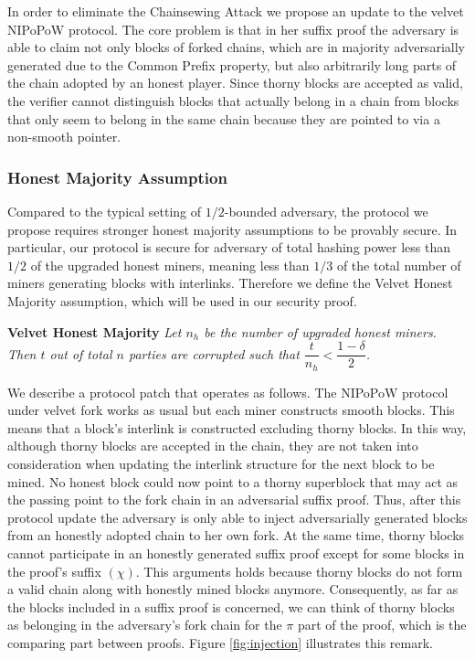 In order to eliminate the Chainsewing Attack we propose an update to the velvet
NIPoPoW protocol. The core problem is that in her suffix proof the adversary
is able to claim not only blocks of forked chains,  which are in majority adversarially
generated due to the Common Prefix property, but also arbitrarily long parts of the
chain adopted by an honest player. Since thorny blocks are accepted as valid,
the verifier cannot distinguish blocks that actually belong in a chain from
blocks that only seem to belong in the same chain because they are pointed to
via a non-smooth pointer. \\


\subsubsection{Honest Majority Assumption}
Compared to the typical setting of $1/2$-bounded adversary, the protocol we
propose requires stronger honest majority assumptions to be provably secure. 
In particular, our protocol is secure for adversary of total hashing power 
less than $1/2$ of the upgraded honest miners, meaning less than $1/3$ of the total number of miners generating blocks with interlinks. Therefore we define the Velvet Honest Majority assumption, which will be used in our security proof.

\begin{defn}{\textbf{Velvet Honest Majority}}
	\textit{Let $n_h$ be the number of upgraded honest miners. Then $t$ out of total $n$
	parties are corrupted such that $\dfrac{t}{n_h} < \dfrac{1 - \delta}{2} $. }
	\label{defn:velvet_honest_majority}
\end{defn}

We describe a protocol patch that operates as follows. The NIPoPoW protocol under velvet fork works as usual but each miner constructs smooth blocks. This means that  a block's interlink is constructed excluding thorny blocks. In this way, although thorny blocks are accepted in the chain, they are not taken into consideration when updating the interlink structure for the next block to be mined. No honest block could now point to a thorny superblock that may act as the passing point to the fork chain in an adversarial suffix proof. Thus, after this protocol update the adversary is only able to inject adversarially generated blocks from an honestly adopted chain to her own fork.
At the same time, thorny blocks cannot participate in an honestly
generated suffix proof except for some blocks in the proof's suffix $(\chi)$. This arguments holds because thorny blocks do not form a valid chain along with honestly mined blocks anymore. Consequently, as far as the blocks included in a suffix proof is concerned, we can think of thorny blocks as belonging in the adversary's fork chain for the $\pi$ part of the proof,  which is the comparing part between proofs. Figure 
\ref{fig:injection} illustrates this remark.\\


